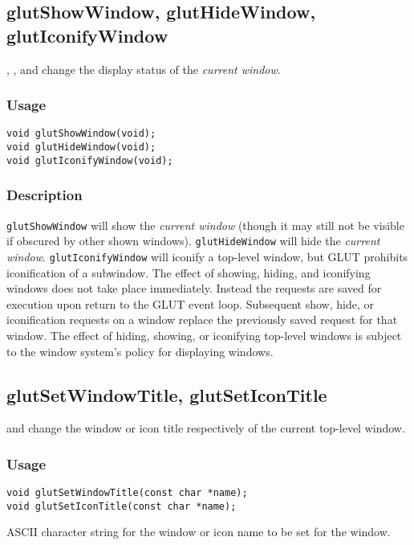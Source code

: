 \subsection{glutShowWindow, glutHideWindow, glutIconifyWindow}

, , and 
change the display status of the {\em current window}.

\subsubsection*{Usage}
\begin{verbatim}
void glutShowWindow(void);
void glutHideWindow(void);
void glutIconifyWindow(void);
\end{verbatim}

\subsubsection*{Description}

{\tt glutShowWindow} will show the {\em current window} (though
it may still not be visible if obscured by other shown windows).  {\tt glutHideWindow} will hide
the {\em current window}.  {\tt glutIconifyWindow} will iconify
a top-level window, but GLUT prohibits iconification of a subwindow.
The effect of showing, hiding, and iconifying windows does not
take place immediately.  Instead the requests are saved
for execution upon return to the GLUT event loop.
Subsequent show, hide, or iconification requests on a window
replace the previously saved request for that window.  The effect of hiding,
showing, or iconifying top-level windows is subject to the window
system's policy for displaying windows.

\subsection{glutSetWindowTitle, glutSetIconTitle}

 and  change
the window or icon title respectively of the current top-level window.

\subsubsection*{Usage}
\begin{verbatim}
void glutSetWindowTitle(const char *name);
void glutSetIconTitle(const char *name);
\end{verbatim}
\begin{description}
\itemsep 0in
\item[{\tt name}]
ASCII character string for the window or icon name to be set for the window.
\end{description}

